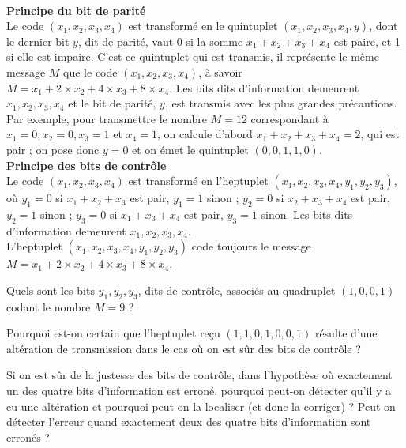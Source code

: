 \documentclass[a4paper,10pt,exos]{nsi}
\begin{document}
    \normalsize

    {\titlefont\color{UGLiBlue}{Codage d'un message avec protection contre les erreurs}}\\
    \question \textbf{\textcolor{UGLiBlue}{Principe du bit de parité}}\\
    Le code $(x_1,x_2,x_3,x_4)$ est transformé en le quintuplet $(x_1,x_2,x_3,x_4,y)$, dont le dernier bit $y$, dit de parité, vaut 0 si la somme $x_1+x_2+x_3+x_4$ est paire, et 1 si elle est impaire. C’est ce quintuplet qui est transmis, il représente le même message $M$ que le code $(x_1,x_2,x_3,x_4)$, à savoir $M=x_1+2\times x_2+4\times x_3+8\times x_4$. Les bits dits d’information demeurent $x_1,x_2,x_3,x_4$ et le bit de parité, $y$, est transmis avec les plus grandes précautions.\\[.5em]
    Par exemple, pour transmettre le nombre $M = 12$ correspondant à $x_1 = 0, x_2 = 0, x_3 = 1$ et $x_4 = 1$, on calcule d’abord $x_1 + x_2 + x_3 + x_4 = 2$, qui est pair ; on pose donc $y = 0$ et on émet le quintuplet $(0,0,1,1,0)$.\\ 

    \question \textbf{\textcolor{UGLiBlue}{Principe des bits de contrôle}}\\
    Le code $(x_1, x_2, x_3, x_4)$ est transformé en l’heptuplet $(x_1, x_2, x_3, x_4, y_1, y_2, y_3)$, où $y_1 = 0$ si $x_1 + x_2 + x_3$ est pair, $y_1 = 1$ sinon ; $y_2 = 0$ si $x_2 + x_3 + x_4$ est pair, $y_2 = 1$ sinon ; $y_3 = 0$ si $x_1 + x_3 + x_4$ est pair, $y_3 = 1$ sinon. Les bits dits d’information demeurent $x_1, x_2, x_3, x_4$.\\
    L’heptuplet $(x_1, x_2, x_3, x_4, y_1, y_2, y_3)$ code toujours le message $M = x_1 + 2 \times x_2 + 4 \times x_3 + 8 \times x_4$.

    \begin{enumalph}
        \item Quels sont les bits $y_1, y_2, y_3$, dits de contrôle, associés au quadruplet $(1,0,0,1)$ codant le nombre $M = 9$ ?
        \item Pourquoi est-on certain que l’heptuplet reçu $(1,1,0,1,0,0,1)$ résulte d’une altération de transmission dans le cas où on est sûr des bits de contrôle ?
        \item Si on est sûr de la justesse des bits de contrôle, dans l’hypothèse où exactement un des quatre bits d’information est erroné, pourquoi peut-on détecter qu’il y a eu une altération et pourquoi peut-on la localiser (et donc la corriger) ? Peut-on détecter l’erreur quand exactement deux des quatre bits d’information sont erronés ?
        
    \end{enumalph}
\end{document}
